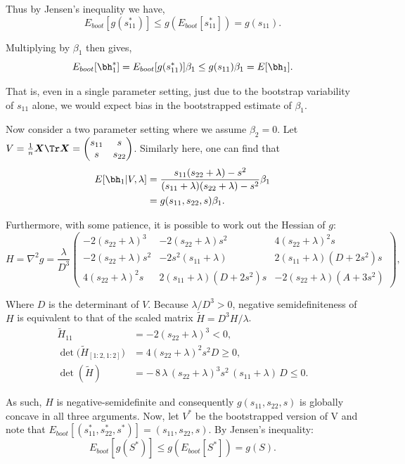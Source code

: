 \noindent Thus by Jensen's inequality we have,
$$
E_{boot}[g(s_{11}^*)] \leq g(E_{boot}[s_{11}^*]) = g(s_{11}).
$$

\noindent Multiplying by $\beta_1$ then gives,
$$
E_{boot}[\bh_1^*] = E_{boot}[g(s_{11}^*)]\beta_1 \leq g(s_{11})\beta_1 = E[\bh_1].
$$

\noindent That is, even in a single parameter setting, just due to the bootstrap variability of $s_{11}$ alone, we would expect bias in the bootstrapped estimate of $\beta_1$.

Now consider a two parameter setting where we assume $\beta_2 = 0$. Let $V = \frac{1}{n}\boldsymbol{X}\Tr\boldsymbol{X} = \begin{pmatrix} s_{11} & s \\ s & s_{22} \end{pmatrix}$. Similarly here, one can find that
$$
\begin{aligned}
E[\bh_1 | V, \lambda] &= \frac{s_{11}(s_{22} + \lambda) - s^2}{(s_{11} + \lambda)(s_{22} + \lambda) - s^2} \beta_1 \\
&= g(s_{11}, s_{22}, s)\beta_1.
\end{aligned}
$$

\noindent Furthermore, with some patience, it is possible to work out the Hessian of $g$:
$$
H = \nabla^{2}g
= \frac{\lambda}{D^{3}}
  \begin{pmatrix}
    -2(s_{22}+\lambda)^{3} & -2(s_{22}+\lambda)s^{2} & 4(s_{22}+\lambda)^{2}s\\[6pt]
    -2(s_{22}+\lambda)s^{2} & -2s^{2}(s_{11}+\lambda) & 2(s_{11}+\lambda)(D+2s^{2})s\\[6pt]
     4(s_{22}+\lambda)^{2}s &  2(s_{11}+\lambda)(D+2s^{2})s & -2(s_{22}+\lambda)(A+3s^{2})
  \end{pmatrix},
$$

\noindent Where $D$ is the determinant of $V$. Because $\lambda/D^{3}>0$, negative semidefiniteness of $H$ is equivalent to that of the scaled matrix $\tilde H = D^{3}H/\lambda$.
$$
\begin{aligned}
\tilde H_{11} &= -2(s_{22}+\lambda)^{3} < 0, \\
\det\bigl(\tilde H_{[1:2,1:2]}\bigr) &= 4(s_{22}+\lambda)^{2}s^{2}D \geq 0, \\
\det(\tilde H) &= -\,8\,\lambda\,(s_{22}+\lambda)^{3}s^{2}\,(s_{11}+\lambda)\,D \leq 0.
\end{aligned}
$$

\noindent As such, $H$ is negative-semidefinite and consequently $g(s_{11},s_{22},s)$ is globally concave in all three arguments. Now, let $V^*$ be the bootstrapped version of V and note that $E_{boot}[(s_{11}^*, s_{22}^*, s^*)] = (s_{11}, s_{22}, s)$. By Jensen's inequality:
$$
E_{boot}[g(S^*)] \leq g(E_{boot}[S^*]) = g(S).
$$

